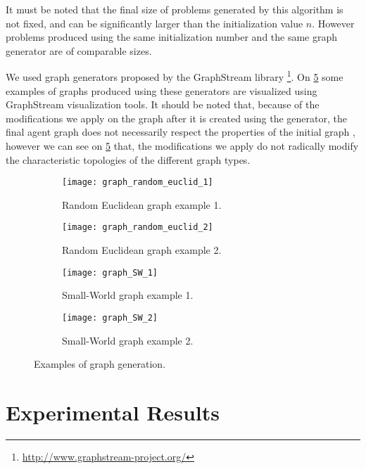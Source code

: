 It must be noted that the final size of problems generated by this algorithm is not fixed, and can be significantly larger than the initialization value $n$. However problems produced using the same initialization number and the same graph generator are of comparable sizes.

We used graph generators proposed by the GraphStream library \footnote{\url{http://www.graphstream-project.org/}}. On \figurename{} \ref{graph_generation_examples} some examples of graphs produced using these generators are visualized using GraphStream visualization tools. It should be noted that, because of the modifications we apply on the graph after it is created using the generator, the final agent graph does not necessarily respect the properties of the initial graph , however we can see on \figurename{} \ref{graph_generation_examples} that, the modifications we apply do not radically modify the characteristic topologies of the different graph types.
 
\begin{figure}
\centering
	\begin{subfigure}[b]{0.45\textwidth}
		\texttt{[image: graph\_random\_euclid\_1]}
		\caption{Random Euclidean graph example 1.}\label{generatedgraphs:rand1}
	\end{subfigure}
	\begin{subfigure}[b]{0.45\textwidth}
			\texttt{[image: graph\_random\_euclid\_2]}
		\caption{Random Euclidean graph example 2.}\label{generatedgraphs:rand2}
	\end{subfigure}
	
	\begin{subfigure}[b]{0.45\textwidth}
		\texttt{[image: graph\_SW\_1]}
		\caption{Small-World graph example 1.}\label{generatedgraphs:sw1}
	\end{subfigure}
	\begin{subfigure}[b]{0.45\textwidth}
			\texttt{[image: graph\_SW\_2]}
		\caption{Small-World graph example 2.}\label{generatedgraphs:sw2}
	\end{subfigure}

\caption{Examples of graph generation.}
\label{graph_generation_examples}
\end{figure}

\section{Experimental Results}

